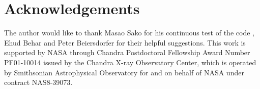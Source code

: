 \documentclass{elsart}
\begin{document}
\section*{Acknowledgements}
The author would like to thank Masao Sako for his continuous test of the code
, Ehud Behar and Peter Beiersdorfer for their helpful suggestions. This work
is supported by NASA through Chandra Postdoctoral Fellowship Award Number
PF01-10014 issued by 
the Chandra X-ray Observatory Center, which is operated by Smithsonian
Astrophysical Observatory for and on behalf of NASA under contract NAS8-39073.



\end{document}
